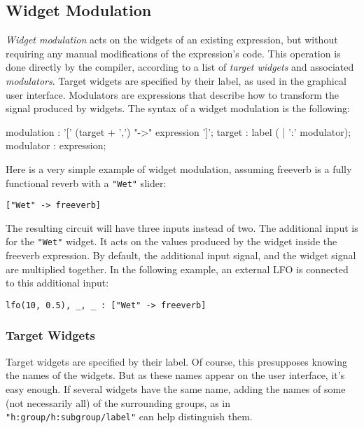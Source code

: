 
\subsection{Widget Modulation}

\emph{Widget modulation} acts on the widgets of an existing \faust expression, but without requiring any manual modifications of the expression's code. This operation is done directly by the compiler, according to a list of \emph{target widgets} and associated \emph{modulators}. Target widgets are specified by their label, as used in the graphical user interface. Modulators are \faust expressions that describe how to transform the signal produced by widgets. The syntax of a widget modulation is the following:

\begin{rail}
    modulation : '[' (target + ',') "->" expression ']';
    target : label ( | ':' modulator);
    modulator : expression;
\end{rail}

Here is a very simple example of widget modulation, assuming freeverb is a fully functional reverb with a \lstinline'"Wet"' slider:

\begin{lstlisting}
["Wet" -> freeverb]
\end{lstlisting}

The resulting circuit will have three inputs instead of two. The additional input is for the \lstinline'"Wet"' widget. It acts on the values produced by the widget inside the freeverb expression. By default, the additional input signal, and the widget signal are multiplied together. In the following example, an external LFO is connected to this additional input:

\begin{lstlisting}
lfo(10, 0.5), _, _ : ["Wet" -> freeverb]
\end{lstlisting}

\subsubsection{Target Widgets}

Target widgets are specified by their label. Of course, this presupposes knowing the names of the widgets. But as these names appear on the user interface, it's easy enough. If several widgets have the same name, adding the names of some (not necessarily all) of the surrounding groups, as in \lstinline`"h:group/h:subgroup/label"` can help distinguish them. 

